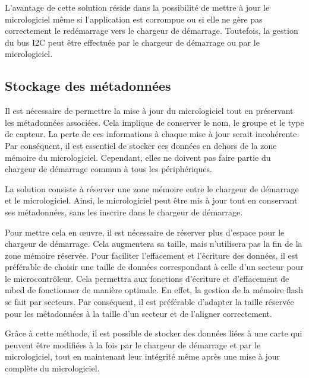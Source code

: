L'avantage de cette solution réside dans la possibilité de mettre à jour le micrologiciel même si l'application est corrompue ou si elle ne gère pas correctement le redémarrage vers le chargeur de démarrage.
Toutefois, la gestion du bus I2C peut être effectuée par le chargeur de démarrage ou par le micrologiciel.

\subsection{Stockage des métadonnées}

Il est nécessaire de permettre la mise à jour du micrologiciel tout en préservant les métadonnées associées.
Cela implique de conserver le nom, le groupe et le type de capteur.
La perte de ces informations à chaque mise à jour serait incohérente.
Par conséquent, il est essentiel de stocker ces données en dehors de la zone mémoire du micrologiciel.
Cependant, elles ne doivent pas faire partie du chargeur de démarrage commun à tous les périphériques.

La solution consiste à réserver une zone mémoire entre le chargeur de démarrage et le micrologiciel.
Ainsi, le micrologiciel peut être mis à jour tout en conservant ses métadonnées, sans les inscrire dans le chargeur de démarrage.

Pour mettre cela en \oe{}uvre, il est nécessaire de réserver plus d'espace pour le chargeur de démarrage.
Cela augmentera sa taille, mais n'utilisera pas la fin de la zone mémoire réservée. Pour faciliter l'effacement et l'écriture des données, il est préférable de choisir une taille de données correspondant à celle d'un secteur pour le microcontrôleur.
Cela permettra aux fonctions d'écriture et d'effacement de mbed de fonctionner de manière optimale.
En effet, la gestion de la mémoire flash se fait par secteurs.
Par conséquent, il est préférable d'adapter la taille réservée pour les métadonnées à la taille d'un secteur et de l'aligner correctement.

Grâce à cette méthode, il est possible de stocker des données liées à une carte qui peuvent être modifiées à la fois par le chargeur de démarrage et par le micrologiciel, tout en maintenant leur intégrité même après une mise à jour complète du micrologiciel.

